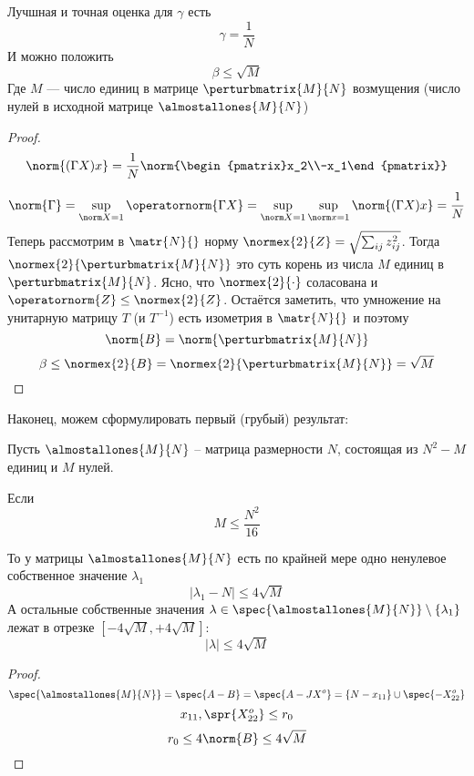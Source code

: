 \begin{lemma}
    Лучшная и точная оценка для \( \gamma \) есть
    \[ \gamma = \frac1N \]
    И можно положить \[ \beta \leq \sqrt{M} \]
    Где \( M \) --- число единиц в матрице \( \perturbmatrix{M}{N} \) возмущения
    (число нулей в исходной матрице \( \almostallones{M}{N} \))
\end{lemma}
\begin{proof}
    \[ \norm{(\Gamma X) x} = \frac1N \norm{\begin{pmatrix}x_2\\-x_1\end{pmatrix}} \]

    \[
        \norm{\Gamma} = \sup_{\norm X = 1} \operatornorm{\Gamma X}
        = \sup_{\norm X = 1} \sup_{\norm x = 1} \norm{(\Gamma X)x} = \frac1N
        \]
    Теперь рассмотрим в \( \matr{N}{} \) норму
    \( \normex{2}{Z} = \sqrt{\sum_{ij} z_{ij}^2} \).
    Тогда \( \normex{2}{\perturbmatrix{M}{N}} \)
    это суть корень из числа \( M \) единиц в \( \perturbmatrix{M}{N} \).
    Ясно, что \( \normex{2}{\cdot} \) соласована и \( \operatornorm{Z} \leq \normex{2}{Z} \).
    Остаётся заметить, что умножение на унитарную матрицу \( T \)
    (и \( T^{-1} \)) есть изометрия
    в \( \matr{N}{} \)
    и поэтому
    \[ \norm{B} = \norm{\perturbmatrix{M}{N}} \]
    \[ \beta \leq \normex{2}{B} = \normex{2}{\perturbmatrix{M}{N}} = \sqrt{M} \]
\end{proof}

Наконец, можем сформулировать первый (грубый) результат:
\begin{thm}
    Пусть \( \almostallones{M}{N} \) -- матрица размерности \( N \),
    состоящая из \( N^2 - M \) единиц и \( M \) нулей.

    Если
    \[
        M \leq \frac{N^2}{16}
        \]

    То у матрицы \( \almostallones{M}{N} \) есть по крайней мере одно ненулевое собственное
    значение \( \lambda_1 \)
    \[ \lvert \lambda_1 - N \rvert \leq 4\sqrt{M} \]
    А остальные собственные значения \( \lambda\in\spec{\almostallones{M}{N}} \setminus \{\lambda_1\} \)
    лежат в отрезке \( \left[-4\sqrt{M},+4\sqrt{M}\right] \):
    \[ \lvert \lambda \rvert \leq 4\sqrt{M} \]
\end{thm}
\begin{proof}
    \[
        \spec{\almostallones{M}{N}} = \spec{A-B} = \spec{A - JX^o}
        = \{ N - x_{11} \} \cup \spec{-X^o_{22}}
        \]
    \[ x_{11}, \spr{X^o_{22}} \leq r_0 \]
    \[ r_0 \leq 4\norm{B} \leq 4\sqrt{M} \]
\end{proof}
